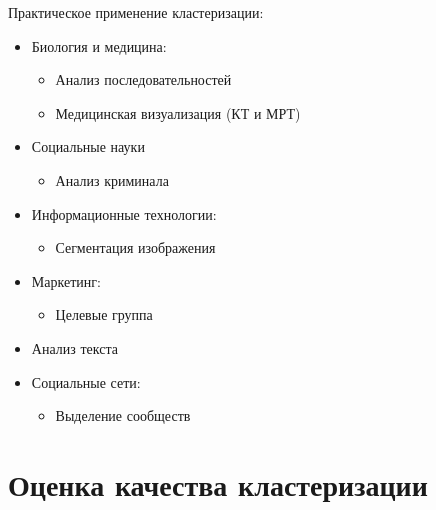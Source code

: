 Практическое применение кластеризации:
\begin{itemize}
    \item Биология и медицина:
    \begin{itemize}
        \item Анализ последовательностей
        \item Медицинская визуализация (КТ и МРТ)
    \end{itemize}
    \item Социальные науки
    \begin{itemize}
        \item Анализ криминала
    \end{itemize}
    \item Информационные технологии:
    \begin{itemize}
        \item Сегментация изображения
    \end{itemize}
    \item Маркетинг:
    \begin{itemize}
        \item Целевые группа
    \end{itemize}
    \item Анализ текста
    \item Социальные сети:
    \begin{itemize}
        \item Выделение сообществ
    \end{itemize}
\end{itemize}

\section{Оценка качества кластеризации}

